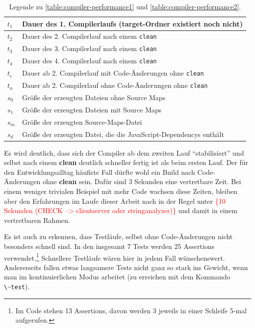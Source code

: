 \documentclass[a4paper, 12pt, hidelinks, listof=totoc, listoftables=totoc, bibliography=totoc]{scrreprt}
\newcommand{\code}[1]{\lstinline[language=Scala, style=inline]|#1|}
\newcommand{\TODOi}[1]{\textcolor{red}{\{#1\}}}
\begin{document}
\begin{table}[!h]
\begin{tabular}{|l|l|}
\hline $t_1$ & Dauer des 1. Compilerlaufs (target-Ordner existiert noch nicht) \\ 
\hline $t_2$ & Dauer des 2. Compilerlauf nach einem \code{clean} \\ 
\hline $t_3$ & Dauer des 3. Compilerlauf nach einem \code{clean} \\ 
\hline $t_4$ & Dauer des 4. Compilerlauf nach einem \code{clean} \\ 
\hline $t_c$ & Dauer ab 2. Compilerlauf mit Code-Änderungen ohne \code{clean} \\ 
\hline $t_n$ & Dauer ab 2. Compilerlauf ohne Code-Änderungen ohne \code{clean} \\ 
\hline $s_0$ & Größe der erzeugten Dateien ohne Source Maps \\ 
\hline $s_1$ & Größe der erzeugten Dateien mit Source Maps \\ 
\hline $s_m$ & Größe der erzeugten Source-Maps-Datei \\ 
\hline $s_d$ & Größe der erzeugten Datei, die die JavaScript-Dependencys enthält \\ 
\hline 
\end{tabular} 
\caption{Legende zu \ref{table:compiler-performance1} und \ref{table:compiler-performance2}.}
\label{table:compiler-performance-legend}
\end{table}

Es wird deutlich, dass sich der Compiler ab dem zweiten Lauf "`stabilisiert"' und selbst nach einem \textbf{clean} deutlich schneller fertig ist als beim ersten Lauf. Der für den Entwicklungsalltag häufiste Fall dürfte wohl ein Build nach Code-Änderungen ohne \textbf{clean} sein. Dafür sind 3 Sekunden eine vertretbare Zeit. Bei einem weniger trivialen Beispiel mit mehr Code wachsen diese Zeiten, bleiben aber den Erfahrungen im Laufe dieser Arbeit nach in der Regel unter \TODOi{10 Sekunden (CHECK --> clientserver oder stringanalyzer)} und damit in einem vertretbaren Rahmen.

Es ist auch zu erkennen, dass Testläufe, selbst ohne Code-Änderungen nicht besonders schnell sind. In den insgesamt 7 Tests werden 25 Assertions verwendet.\footnote{Im Code stehen 13 Assertions, davon werden 3 jeweils in einer Schleife 5-mal aufgerufen.} Schnellere Testläufe wären hier in jedem Fall wünschenswert. Andererseits fallen etwas langsamere Tests nicht ganz so stark ins Gewicht, wenn man im kontinuierlichen Modus arbeitet (zu erreichen mit dem Kommando \code{\~test}).
\end{document}
